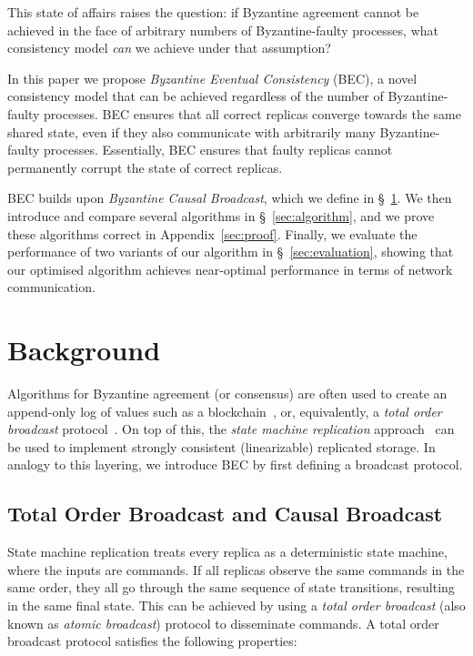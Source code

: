 \documentclass[a4paper,anonymous,USenglish]{lipics-v2019}
\begin{document}
This state of affairs raises the question: if Byzantine agreement cannot be achieved in the face of arbitrary numbers of Byzantine-faulty processes, what consistency model \emph{can} we achieve under that assumption?

In this paper we propose \emph{Byzantine Eventual Consistency} (BEC), a novel consistency model that can be achieved regardless of the number of Byzantine-faulty processes.
BEC ensures that all correct replicas converge towards the same shared state, even if they also communicate with arbitrarily many Byzantine-faulty processes.
Essentially, BEC ensures that faulty replicas cannot permanently corrupt the state of correct replicas.

BEC builds upon \emph{Byzantine Causal Broadcast}, which we define in \S~\ref{sec:properties}.
We then introduce and compare several algorithms in \S~\ref{sec:algorithm}, and we prove these algorithms correct in Appendix~\ref{sec:proof}.
Finally, we evaluate the performance of two variants of our algorithm in \S~\ref{sec:evaluation}, showing that our optimised algorithm achieves near-optimal performance in terms of network communication.


\section{Background}\label{sec:properties}

Algorithms for Byzantine agreement (or consensus) are often used to create an append-only log of values such as a blockchain~\cite{Bano:2019}, or, equivalently, a \emph{total order broadcast} protocol~\cite{Defago:2004ji}.
On top of this, the \emph{state machine replication} approach~\cite{Schneider:1990} can be used to implement strongly consistent (linearizable) replicated storage.
In analogy to this layering, we introduce BEC by first defining a broadcast protocol.

\subsection{Total Order Broadcast and Causal Broadcast}\label{sec:broadcast}

State machine replication treats every replica as a deterministic state machine, where the inputs are commands.
If all replicas observe the same commands in the same order, they all go through the same sequence of state transitions, resulting in the same final state.
This can be achieved by using a \emph{total order broadcast} (also known as \emph{atomic broadcast}) protocol to disseminate commands.
A total order broadcast protocol satisfies the following properties:
\end{document}
